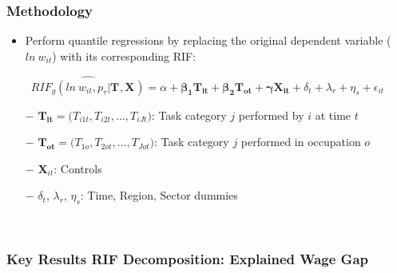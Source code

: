 \documentclass[10pt]{beamer}
\begin{document}
\begin{frame}[label=regression]  
	\frametitle{Methodology}
	
	
	\begin{itemize}
		\item Perform quantile regressions by replacing the original dependent variable ($ln\ w_{it}$) with its corresponding RIF:
	\end{itemize}
	
	
	\begin{equation} \label{6}
	\widehat{RIF_{g}(ln\ w_{it},p_{\tau}| \boldsymbol{T_{}}, \boldsymbol{X_{}}      ) } = \alpha + \boldsymbol{ \beta_{1} } \boldsymbol{T_{it}} + \boldsymbol{ \beta_{2} } \boldsymbol{T_{ot}} + \boldsymbol{ \gamma } \boldsymbol{X_{it}} + \delta_t + \lambda_r + \eta_s  + \epsilon_{it}
	\end{equation} 
	
	\begin{itemize}
		\item[$-$]$\boldsymbol{T_{it}} = \big(T_{i1t}, T_{i2t}, ..., T_{iJt} \big)$: Task category $j$ performed by $i$ at time $t$ \\
		\item[$-$]$\boldsymbol{T_{ot}} = \big(T_{1o}, T_{2ot}, ..., T_{Jot} \big)$: Task category $j$ performed in occupation $o$ \\
		\item[$-$]$\textbf{X}_{it}$: Controls \\
		\item[$-$]$\delta_t$, $\lambda_r$, $\eta_s$: Time, Region, Sector dummies
	\end{itemize} 
	
\hyperlink{occ_spec}{} \\
\hyperlink{wi_spec}{} 	
	
	
	
\end{frame}

\begin{frame}
	\frametitle{Key Results RIF Decomposition: Explained Wage Gap}
	
	
%	
	
	
\end{frame}
\end{document}

